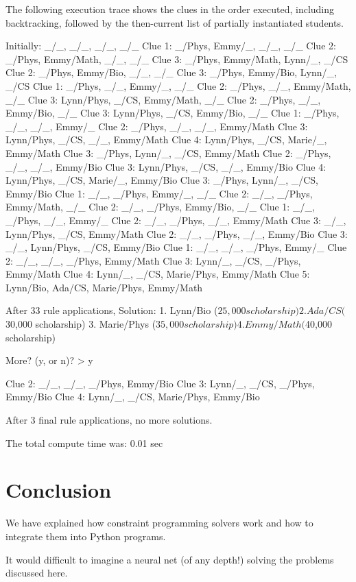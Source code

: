 The following execution trace shows the clues in the order executed, including backtracking, followed by the then-current list of partially instantiated students.

\begin{python1}
Initially: _/_, _/_, _/_, _/_
Clue 1: _/Phys, Emmy/_, _/_, _/_
Clue 2: _/Phys, Emmy/Math, _/_, _/_
Clue 3: _/Phys, Emmy/Math, Lynn/_, _/CS
Clue 2: _/Phys, Emmy/Bio, _/_, _/_
Clue 3: _/Phys, Emmy/Bio, Lynn/_, _/CS
Clue 1: _/Phys, _/_, Emmy/_, _/_
Clue 2: _/Phys, _/_, Emmy/Math, _/_
Clue 3: Lynn/Phys, _/CS, Emmy/Math, _/_
Clue 2: _/Phys, _/_, Emmy/Bio, _/_
Clue 3: Lynn/Phys, _/CS, Emmy/Bio, _/_
Clue 1: _/Phys, _/_, _/_, Emmy/_
Clue 2: _/Phys, _/_, _/_, Emmy/Math
Clue 3: Lynn/Phys, _/CS, _/_, Emmy/Math
Clue 4: Lynn/Phys, _/CS, Marie/_, Emmy/Math
Clue 3: _/Phys, Lynn/_, _/CS, Emmy/Math
Clue 2: _/Phys, _/_, _/_, Emmy/Bio
Clue 3: Lynn/Phys, _/CS, _/_, Emmy/Bio
Clue 4: Lynn/Phys, _/CS, Marie/_, Emmy/Bio
Clue 3: _/Phys, Lynn/_, _/CS, Emmy/Bio
Clue 1: _/_, _/Phys, Emmy/_, _/_
Clue 2: _/_, _/Phys, Emmy/Math, _/_
Clue 2: _/_, _/Phys, Emmy/Bio, _/_
Clue 1: _/_, _/Phys, _/_, Emmy/_
Clue 2: _/_, _/Phys, _/_, Emmy/Math
Clue 3: _/_, Lynn/Phys, _/CS, Emmy/Math
Clue 2: _/_, _/Phys, _/_, Emmy/Bio
Clue 3: _/_, Lynn/Phys, _/CS, Emmy/Bio
Clue 1: _/_, _/_, _/Phys, Emmy/_
Clue 2: _/_, _/_, _/Phys, Emmy/Math
Clue 3: Lynn/_, _/CS, _/Phys, Emmy/Math
Clue 4: Lynn/_, _/CS, Marie/Phys, Emmy/Math
Clue 5: Lynn/Bio, Ada/CS, Marie/Phys, Emmy/Math

After 33 rule applications,
Solution: 
	1. Lynn/Bio	($25,000 scholarship)
	2. Ada/CS	($30,000 scholarship)
	3. Marie/Phys	($35,000 scholarship)
	4. Emmy/Math	($40,000 scholarship)

More? (y, or n)? > y

Clue 2: _/_, _/_, _/Phys, Emmy/Bio
Clue 3: Lynn/_, _/CS, _/Phys, Emmy/Bio
Clue 4: Lynn/_, _/CS, Marie/Phys, Emmy/Bio

After 3 final rule applications, no more solutions.

The total compute time was: 0.01 sec
\end{python1}

\section{Conclusion} \label{sec:conclusion}

We have explained how constraint programming solvers work and how to integrate them into Python programs. 

It would difficult to imagine a neural net (of any depth!) solving the problems discussed here.
